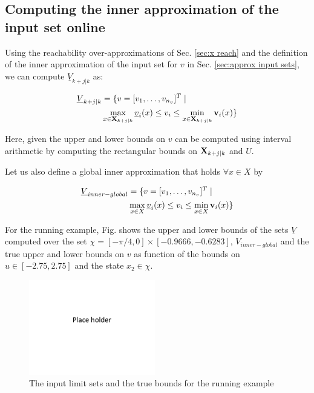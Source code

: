 \subsection{Computing the inner approximation of the input set online}

Using the reachability over-approximations of Sec. \ref{sec:x reach} and the definition of the inner approximation of the input set for $v$ in Sec. \ref{sec:approx input sets}, we can compute $\underline{V}_{k+j|k}$ as:

\begin{subequations}
\begin{align}
\underline{V}_{k+j|k} &= \{v=[v_1,\ldots,v_{n_v}]^T \;|\; \nonumber \\
&\max_{x\in \mathbf{X}_{k+j|k}} \underline{v}_i(x)  \leq v_i \leq \min_{x \in \mathbf{X}_{k+j|k}} \mathbf{v}_i(x) \} 
\end{align}
\end{subequations}

Here, given the upper and lower bounds on $v$ can be computed using interval arithmetic by computing the rectangular bounds on $\mathbf{X}_{k+j|k}$ and $U$. 

Let us also define a global inner approximation that holds $\forall x \in X$ by 

\begin{subequations}
\begin{align}
\underline{V}_{inner-global} &= \{v=[v_1,\ldots,v_{n_v}]^T \;|\; \nonumber \\
&\max_{x\in X} \underline{v}_i(x)  \leq v_i \leq \min_{x \in X} \mathbf{v}_i(x) \} 
\end{align}
\end{subequations}

For the running example, Fig. {} shows the upper and lower bounds of the sets $\underline{V}$ computed over the set  $\chi = [-\pi/4,0]\times[-0.9666,-0.6283]$, $V_{inner-global}$ and the true upper and lower bounds on $v$ as function of the bounds on $u \in [-2.75,2.75] $ and the state $x_2 \in \chi$.

\begin{figure}
\includegraphics[width=0.49\textwidth]{figs/placeHolder.pdf}
\caption{The input limit sets and the true bounds for the running example}
\label{fig:err_bound_toy}
\end{figure}


